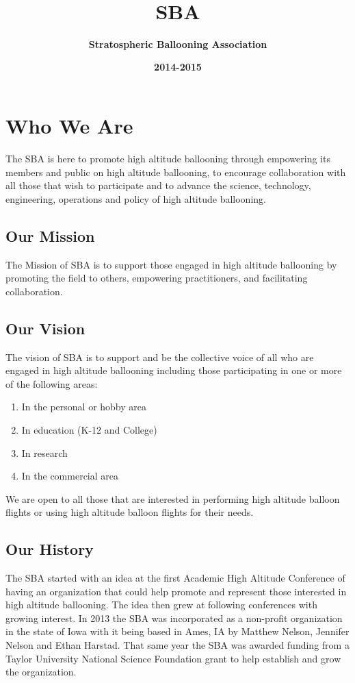\documentclass[10pt,foldmark,notumble]{leaflet}
\title{\bf \ \\ \ \\ \ \\ \ \\SBA}
\author{%
\Large \bf Stratospheric Ballooning Association
}
\date{\bf 2014-2015 }
\begin{document}
\maketitle
\section{Who We Are}
The SBA is here to promote high altitude ballooning through empowering its members and public on high altitude ballooning, to encourage collaboration with all those that wish to participate and to advance the science, technology, engineering, operations and policy of high altitude ballooning.

\subsection{Our Mission}
The Mission of SBA is to support those engaged in high altitude ballooning by promoting the field to others, empowering practitioners, and facilitating collaboration.

\subsection{Our Vision}
The vision of SBA is to support and be the collective voice of all who are engaged in high altitude ballooning including those participating in one or more of the following areas: 
\begin{enumerate}
\item In the personal or hobby area
\item In education (K-12 and College)
\item In research
\item In the commercial area
\end{enumerate}
We are open to all those that are interested in performing high altitude balloon flights or using high altitude balloon flights for their needs.

\subsection{Our History}
The SBA started with an idea at the first Academic High Altitude Conference of having an organization that could help promote and represent those interested in high altitude ballooning.  The idea then grew at following conferences with growing interest.  In 2013 the SBA was incorporated as a non-profit organization in the state of Iowa with it being based in Ames, IA by Matthew Nelson, Jennifer Nelson and Ethan Harstad.  That same year the SBA was awarded funding from a Taylor University National Science Foundation grant to help establish and grow the organization.  
\end{document}
